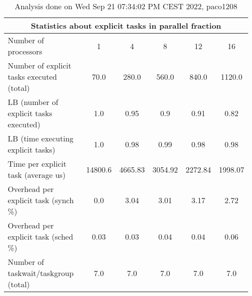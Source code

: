 \begin{table}[h]
\begin{center}
\begin{tabular}{|l|c|c|c|c|c|}
\hline
\multicolumn{6}{|c|}{Statistics about explicit tasks in parallel fraction} \\
\hline
\hline
Number of processors & 1 & 4 & 8 & 12 & 16 \\
\hline
\hline
Number of explicit tasks executed (total)        &            70.0 &           280.0 &           560.0 &           840.0 &          1120.0 \\
\hline
LB (number of explicit tasks executed)           &             1.0 &            0.95 &             0.9 &            0.91 &            0.82 \\
\hline
LB (time executing explicit tasks)               &             1.0 &            0.98 &            0.99 &            0.98 &            0.98 \\
\hline
Time per explicit task (average us)                 &         14800.6 &         4665.83 &         3054.92 &         2272.84 &         1998.07 \\
\hline
Overhead per explicit task (synch \%)             &             0.0 &            3.04 &            3.01 &            3.17 &            2.72 \\
\hline
Overhead per explicit task (sched \%)             &            0.03 &            0.03 &            0.04 &            0.04 &            0.06 \\
\hline
Number of taskwait/taskgroup (total)             &             7.0 &             7.0 &             7.0 &             7.0 &             7.0 \\
\hline
\end{tabular}
\end{center}
\caption{ Analysis done on Wed Sep 21 07:34:02 PM CEST 2022, paco1208}
\end{table}
